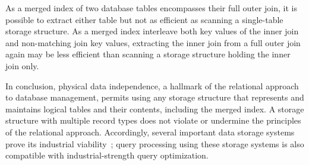 \documentclass[biblatex, english]{lni}
\begin{document}
As a merged index of two database tables encompasses their full outer join, it is possible to extract either table but not as efficient as scanning a single-table storage structure.
As a merged index interleave both key values of the inner join and non-matching join key values, extracting the inner join from a full outer join again may be less efficient than scanning a storage structure holding the inner join only.

In conclusion, physical data independence, a hallmark of the relational approach to database management, permits  using any storage structure that represents and maintains logical tables and their contents, including the merged index.
A storage structure with multiple record types does not violate or undermine the principles of the relational approach. Accordingly, several important data storage systems prove its industrial viability~\cite{ oracle-table-cluster, Google-Spanner}; query processing using these storage systems is also compatible with industrial-strength query optimization.

\printbibliography
\end{document}
